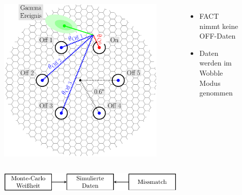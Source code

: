\documentclass[aspectratio=1610, professionalfonts, 9pt]{beamer}
\begin{document}
\begin{frame}
  \begin{columns}
	\begin{figure}
	  \centering
	  \includegraphics[height=0.8\textheight]{./images/wobble.pdf}
	\end{figure}
	\begin{itemize}
		\item FACT nimmt keine OFF-Daten
		\item Daten werden im Wobble Modus genommen
	\end{itemize}
  \end{columns}
\end{frame}

\begin{frame}
	\begin{figure}
	  \centering
	  \includegraphics[width=0.8\textwidth]{./tikz/Missmatch/Missmatch.pdf}
	\end{figure}
\end{frame}
\end{document}
